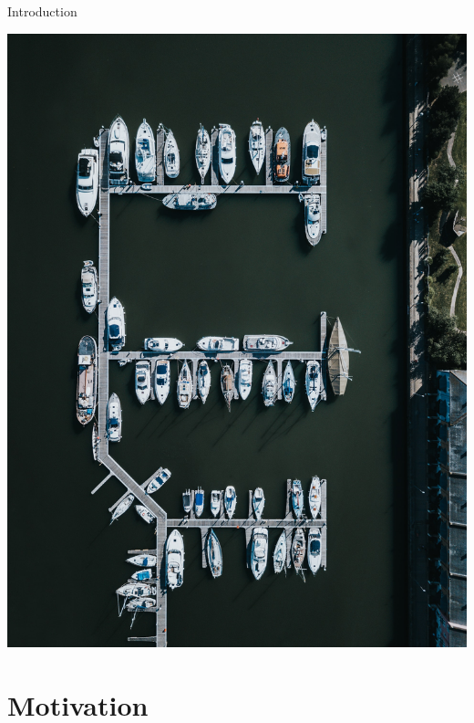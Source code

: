 \documentclass[10pt, xcolor={usenames, dvipsnames}]{beamer}
\begin{document}
\begin{frame}{Introduction}
\begin{minipage}[c]{0.4\textwidth}
                \includegraphics[height=\textwidth, angle=90, origin=c]{imgs/harbour.jpg}
                \vspace{-1cm}
            \end{minipage}
        \end{frame}

    \section{Motivation}
\end{document}
